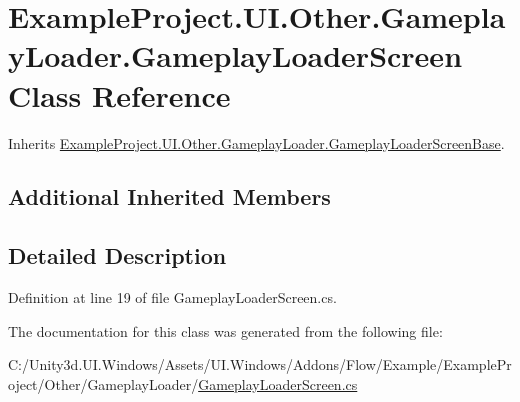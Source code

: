 \hypertarget{class_example_project_1_1_u_i_1_1_other_1_1_gameplay_loader_1_1_gameplay_loader_screen}{}\section{Example\+Project.\+U\+I.\+Other.\+Gameplay\+Loader.\+Gameplay\+Loader\+Screen Class Reference}
\label{class_example_project_1_1_u_i_1_1_other_1_1_gameplay_loader_1_1_gameplay_loader_screen}


Inherits \hyperlink{class_example_project_1_1_u_i_1_1_other_1_1_gameplay_loader_1_1_gameplay_loader_screen_base}{Example\+Project.\+U\+I.\+Other.\+Gameplay\+Loader.\+Gameplay\+Loader\+Screen\+Base}.

\subsection*{Additional Inherited Members}


\subsection{Detailed Description}


Definition at line 19 of file Gameplay\+Loader\+Screen.\+cs.



The documentation for this class was generated from the following file\+:\begin{DoxyCompactItemize}
\item 
C\+:/\+Unity3d.\+U\+I.\+Windows/\+Assets/\+U\+I.\+Windows/\+Addons/\+Flow/\+Example/\+Example\+Project/\+Other/\+Gameplay\+Loader/\hyperlink{_gameplay_loader_screen_8cs}{Gameplay\+Loader\+Screen.\+cs}\end{DoxyCompactItemize}
